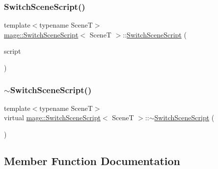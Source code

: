 \hypertarget{classmage_1_1_switch_scene_script_a6803282c82656616ac7459b34e85fdc7}{}\label{classmage_1_1_switch_scene_script_a6803282c82656616ac7459b34e85fdc7} 
\subsubsection{\texorpdfstring{Switch\+Scene\+Script()}{SwitchSceneScript()}\hspace{0.1cm}{\footnotesize\ttfamily [3/3]}}
{\footnotesize\ttfamily template$<$typename SceneT$>$ \\
\hyperlink{classmage_1_1_switch_scene_script}{mage\+::\+Switch\+Scene\+Script}$<$ SceneT $>$\+::\hyperlink{classmage_1_1_switch_scene_script}{Switch\+Scene\+Script} (\begin{DoxyParamCaption}\item[{\hyperlink{classmage_1_1_switch_scene_script}{Switch\+Scene\+Script}$<$ SceneT $>$ \&\&}]{script }\end{DoxyParamCaption})}

\hypertarget{classmage_1_1_switch_scene_script_a9c5907dfea7512a934e37136a9e3970b}{}\label{classmage_1_1_switch_scene_script_a9c5907dfea7512a934e37136a9e3970b} 
\subsubsection{\texorpdfstring{$\sim$\+Switch\+Scene\+Script()}{~SwitchSceneScript()}}
{\footnotesize\ttfamily template$<$typename SceneT$>$ \\
virtual \hyperlink{classmage_1_1_switch_scene_script}{mage\+::\+Switch\+Scene\+Script}$<$ SceneT $>$\+::$\sim$\hyperlink{classmage_1_1_switch_scene_script}{Switch\+Scene\+Script} (\begin{DoxyParamCaption}{ }\end{DoxyParamCaption})\hspace{0.3cm}{\ttfamily [virtual]}}



\subsection{Member Function Documentation}
\hypertarget{classmage_1_1_switch_scene_script_afa17a58d641d05ac406fecb43c84ec2b}{}\label{classmage_1_1_switch_scene_script_afa17a58d641d05ac406fecb43c84ec2b} 
